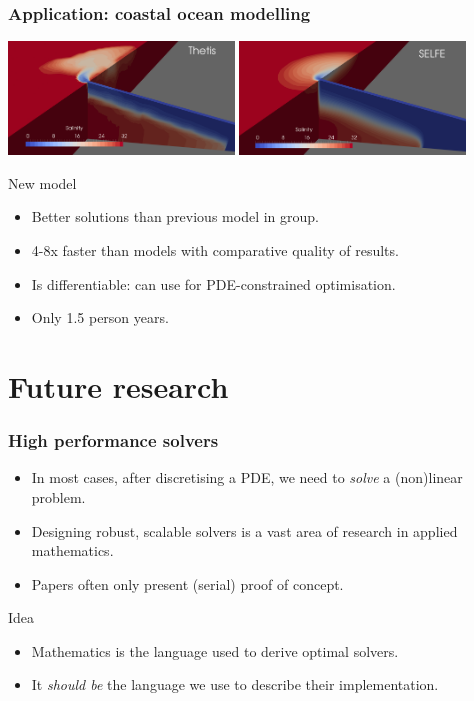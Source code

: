 \documentclass[presentation]{beamer}
\begin{document}
\begin{frame}
  \frametitle{Application: coastal ocean modelling}
  \begin{center}
    \includegraphics[width=0.45\textwidth]{thetis-rhine} \hspace{1em}
    \includegraphics[width=0.45\textwidth]{selfe-rhine}
  \end{center}
  \begin{block}{New model}
    \begin{itemize}
    \item Better solutions than previous model in group.
    \item 4-8x faster than models with comparative quality of
      results.
    \item Is differentiable: can use for PDE-constrained optimisation.
    \item Only 1.5 person years.
    \end{itemize}
  \end{block}
\end{frame}
\section{Future research}

\begin{frame}
  \frametitle{High performance solvers}
  \begin{itemize}
  \item In most cases, after discretising a PDE, we need to
    \emph{solve} a (non)linear problem.
  \item Designing robust, scalable solvers is a vast area of research
    in applied mathematics.
  \item Papers often only present (serial) proof of concept.
  \end{itemize}
  \begin{block}{Idea}
    \begin{itemize}
    \item Mathematics is the language used to derive optimal solvers.

    \item It \emph{should be} the language we use to describe their implementation.
    \end{itemize}
  \end{block}
\end{frame}
\end{document}
